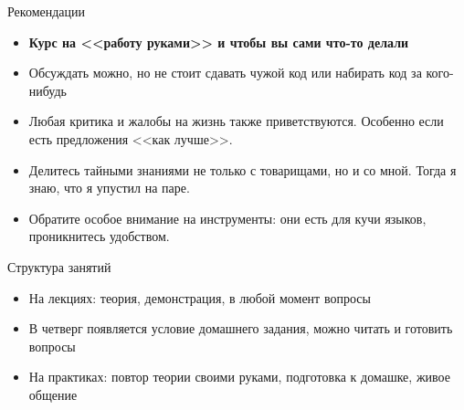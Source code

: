 \begin{frame}[t]{Рекомендации}
	\begin{itemize}
		\item \textbf{Курс на <<работу руками>> и чтобы вы сами что-то делали}
		\item Обсуждать можно, но не стоит сдавать чужой код или набирать код за кого-нибудь
		\item
			Любая критика и жалобы на жизнь также приветствуются.
			Особенно если есть предложения <<как лучше>>.
		\item
			Делитесь тайными знаниями не только с товарищами, но и со мной.
			Тогда я знаю, что я упустил на паре.
		\item
			Обратите особое внимание на инструменты: они есть для кучи языков,
			проникнитесь удобством.
	\end{itemize}
\end{frame}

\begin{frame}[t]{Структура занятий}
	\begin{itemize}
		\item На лекциях: теория, демонстрация, в любой момент вопросы
		\item В четверг появляется условие домашнего задания, можно читать и готовить вопросы
		\item На практиках: повтор теории своими руками, подготовка к домашке, живое общение
	\end{itemize}
\end{frame}
